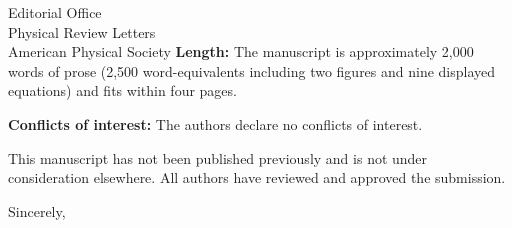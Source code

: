 \documentclass[11pt]{letter}
\begin{document}
\begin{letter}{Editorial Office\\Physical Review Letters\\American Physical Society}
\textbf{Length:} The manuscript is approximately 2,000 words of prose
(2,500 word-equivalents including two figures and nine displayed
equations) and fits within four pages.

\textbf{Conflicts of interest:} The authors declare no conflicts of
interest.

This manuscript has not been published previously and is not under
consideration elsewhere.  All authors have reviewed and approved the
submission.

\closing{Sincerely,}

\end{letter}
\end{document}
